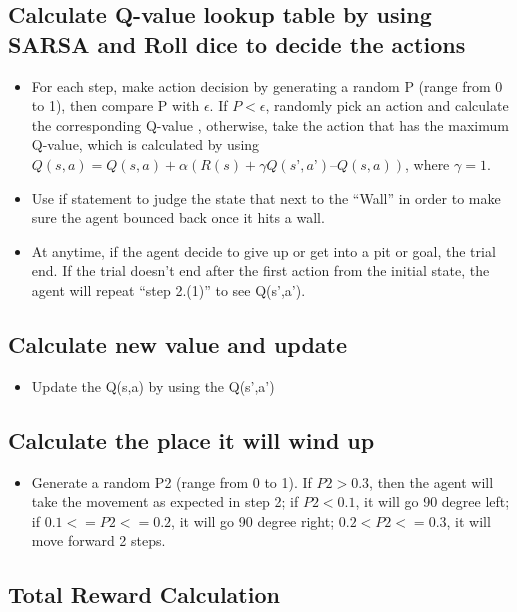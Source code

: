 \documentclass[11pt, a4paper]{article}
\begin{document}
\subsection{Calculate Q-value lookup table by using SARSA and Roll dice to decide the actions}

\begin{itemize}
\item For each step, make action decision by generating a random P (range from 0 to 1), then compare P with $\epsilon$. If $P < \epsilon$, randomly pick an action and calculate the corresponding Q-value , otherwise, take the action that has the maximum Q-value, which is calculated by using $Q(s, a) = Q(s,a) + α(R(s) + \gamma Q(s’,a’) – Q(s,a))$, where $\gamma = 1$.

\item Use if statement to judge the state that next to the “Wall” in order to make sure the agent bounced back once it hits a wall.

\item At anytime, if the agent decide to give up or get into a pit or goal, the trial end. If the trial doesn’t end after the first action from the initial state, the agent will repeat “step 2.(1)” to see Q(s’,a’).

\end{itemize}

\subsection{Calculate new value and update}
\begin{itemize}
	\item Update the Q(s,a) by using the Q(s’,a’)
\end{itemize}


\subsection{Calculate the place it will wind up}

\begin{itemize}
	\item Generate a random P2 (range from 0 to 1). If $P2 > 0.3$, then the agent will take the movement as expected in step 2; if $P2 < 0.1$, it will go 90 degree left; if $0.1<= P2 <= 0.2$, it will go 90 degree right; $0.2 < P2 <= 0.3$, it will move forward 2 steps.
	
\end{itemize}

\subsection{Total Reward Calculation}
\end{document}
